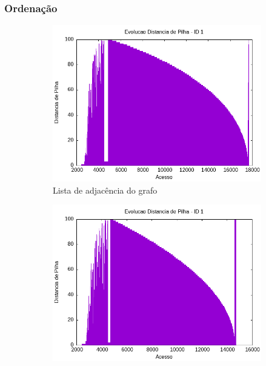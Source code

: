 \documentclass{article}
\begin{document}
\subsubsection{Ordenação}


\begin{figure}[H]
    \centering
    \hfill
    \begin{subfigure}[c]{0.4\textwidth}
        \centering
        \includegraphics[width=\textwidth]{./images/100-200/bubblesort/registro_a-distp-1.png}
        \caption{Lista de adjacência do grafo}
        \label{fig:ac05}
    \end{subfigure}
    \hfill
    \begin{subfigure}[c]{0.4\textwidth}
        \centering
        \includegraphics[width=\textwidth]{./images/100-200/selectionsort/registro_a-distp-1.png}

\end{subfigure}
\end{figure}
\end{document}
